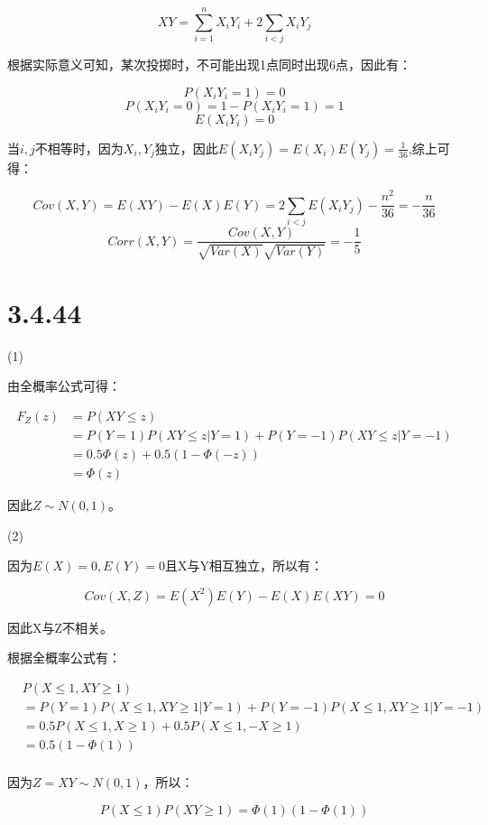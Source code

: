 \documentclass{article}
\begin{document}
$$XY=\sum^n_{i=1}X_iY_i+2\sum_{i<j}X_iY_j$$

根据实际意义可知，某次投掷时，不可能出现1点同时出现6点，因此有：

$$P(X_iY_i=1)=0$$
$$P(X_iY_i=0)=1-P(X_iY_i=1)=1$$
$$E(X_iY_i)=0$$

当$i,j$不相等时，因为$X_i,Y_j$独立，因此$E(X_iY_j)=E(X_i)E(Y_j)=\frac1{36}$,综上可得：

$$Cov(X,Y)=E(XY)-E(X)E(Y)=2\sum_{i<j}E(X_iY_j)-\frac{n^2}{36}=-\frac{n}{36}$$
$$Corr(X,Y)=\frac{Cov(X,Y)}{\sqrt{Var(X)}\sqrt{Var(Y)}}=-\frac15$$



\section{3.4.44}

(1)

由全概率公式可得：

\begin{equation}
\begin{aligned}
F_Z(z)&=P(XY\leq z)\\
&=P(Y=1)P(XY\leq z|Y=1)+P(Y=-1)P(XY \leq z|Y=-1)\\
&=0.5\Phi(z)+0.5(1-\Phi(-z))\\
&=\Phi(z)
\end{aligned}
\end{equation}

因此$Z\sim N(0,1)$。

(2)

因为$E(X)=0,E(Y)=0$且X与Y相互独立，所以有：

$$Cov(X,Z)=E(X^2)E(Y)-E(X)E(XY)=0$$

因此X与Z不相关。

根据全概率公式有：

\begin{equation}
\begin{aligned}
&P(X\leq 1,XY \geq 1)\\
&=P(Y=1)P(X\leq 1,XY\geq 1| Y=1)+P(Y=-1)P(X\leq 1,XY\geq 1| Y=-1)\\
&=0.5P(X\leq 1,X\geq 1)+0.5P(X\leq 1,-X\geq 1)\\
&=0.5(1-\Phi(1))\\
\end{aligned}
\end{equation}

因为$Z=XY\sim N(0,1)$，所以：

$$P(X\leq 1)P(XY\geq 1)=\Phi(1)(1-\Phi(1))$$
\end{document}
